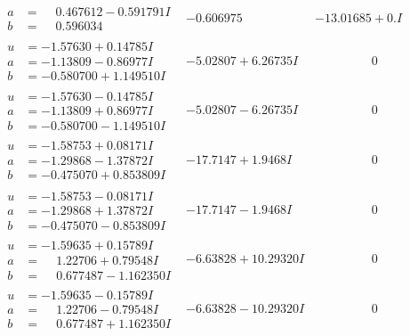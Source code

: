 \documentclass[1p]{elsarticle_modified}
\theoremstyle{definition}
\begin{document}
$$\begin{array}{c|c|c}
\begin{aligned}
a &= \phantom{-}0.467612 - 0.591791 I \\
b &= \phantom{-}0.596034\phantom{ +0.000000I}\end{aligned}
 & -0.606975\phantom{ +0.000000I} & -13.01685 + 0. I\phantom{ +0.000000I} \\ \hline\begin{aligned}
u &= -1.57630 + 0.14785 I \\
a &= -1.13809 - 0.86977 I \\
b &= -0.580700 + 1.149510 I\end{aligned}
 & -5.02807 + 6.26735 I & \phantom{-0.000000 } 0 \\ \hline\begin{aligned}
u &= -1.57630 - 0.14785 I \\
a &= -1.13809 + 0.86977 I \\
b &= -0.580700 - 1.149510 I\end{aligned}
 & -5.02807 - 6.26735 I & \phantom{-0.000000 } 0 \\ \hline\begin{aligned}
u &= -1.58753 + 0.08171 I \\
a &= -1.29868 - 1.37872 I \\
b &= -0.475070 + 0.853809 I\end{aligned}
 & -17.7147 + 1.9468 I & \phantom{-0.000000 } 0 \\ \hline\begin{aligned}
u &= -1.58753 - 0.08171 I \\
a &= -1.29868 + 1.37872 I \\
b &= -0.475070 - 0.853809 I\end{aligned}
 & -17.7147 - 1.9468 I & \phantom{-0.000000 } 0 \\ \hline\begin{aligned}
u &= -1.59635 + 0.15789 I \\
a &= \phantom{-}1.22706 + 0.79548 I \\
b &= \phantom{-}0.677487 - 1.162350 I\end{aligned}
 & -6.63828 + 10.29320 I & \phantom{-0.000000 } 0 \\ \hline\begin{aligned}
u &= -1.59635 - 0.15789 I \\
a &= \phantom{-}1.22706 - 0.79548 I \\
b &= \phantom{-}0.677487 + 1.162350 I\end{aligned}
 & -6.63828 - 10.29320 I & \phantom{-0.000000 } 0 \\ \hline\begin{aligned}

\end{aligned}
\end{array}$$
\end{document}
